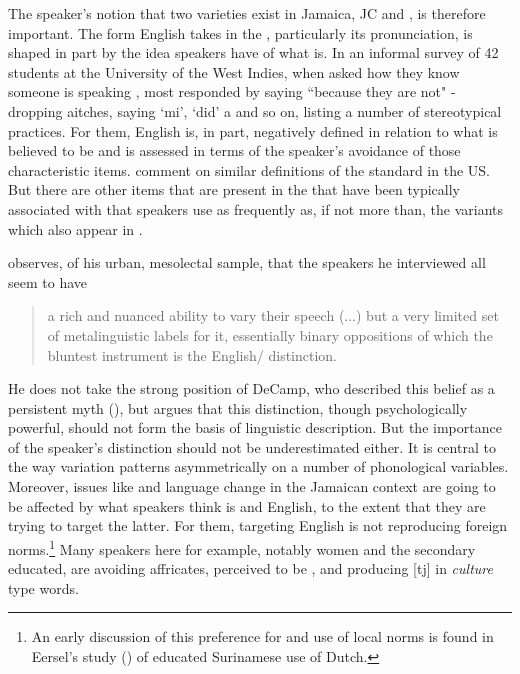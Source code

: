 The speaker's notion that two varieties exist in Jamaica, JC and , is therefore important.  The form English takes in the , particularly its pronunciation, is shaped in part by the idea speakers have of what  is.  In an informal survey of 42 students at the University of the West Indies, when asked how they know someone is speaking , most responded by saying ``because they are not" - dropping aitches, saying ‘mi’, ‘did’ a and so on, listing a number of stereotypical  practices.  For them, English is, in part, negatively defined in relation to what  is believed to be and is assessed in terms of the speaker's avoidance of those characteristic items.  \citet[12]{Wolfram1998} comment on similar definitions of the standard in the US.    But there are other items that are present in the  that have been typically associated with  that speakers use as frequently as, if not more than, the variants which also appear in . 

\citet[9]{Patrick1999} observes, of his urban, mesolectal sample, that the speakers he interviewed all seem to have

\begin{quote}
	a rich and nuanced ability to vary their speech (...) but a very limited set of metalinguistic labels for it, essentially binary oppositions of which the bluntest instrument is the English\slash {} distinction.
\end{quote}

He does not take the strong position of DeCamp, who described this belief as a persistent myth (\citeyear[350]{DeCamp1971}), but argues that this distinction, though psychologically powerful, should not form the basis of linguistic description.  But the importance of the speaker’s distinction should not be underestimated either.  It is central to the way variation patterns asymmetrically on a number of phonological variables.  Moreover, issues like  and language change in the Jamaican context are going to be affected by what speakers think is  and English, to the extent that they are trying to target the latter.  For them, targeting English is not reproducing foreign norms.\footnote{An early discussion of this preference for and use of local norms is found in Eersel’s study (\citeyear[320]{Eersel1971}) of educated Surinamese use of Dutch.}   Many speakers here for example, notably women and the secondary educated, are avoiding affricates, perceived to be , and producing [tj] in \textit{culture} type words.

